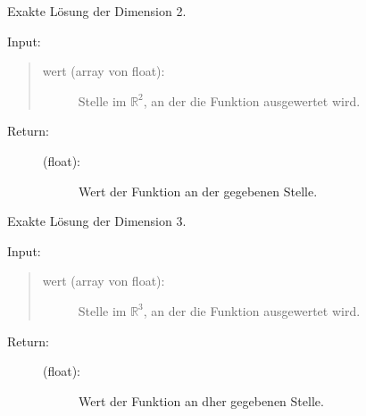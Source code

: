 \documentclass[letterpaper,10pt,ngerman, oneside, openright]{sphinxmanual}
\begin{document}

\begin{fulllineitems}
\label{\detokenize{index:aufg_5_2.ulsg2}}
Exakte Lösung der Dimension 2.
\begin{description}
\item [{Input:}]
\end{description}
\begin{quote}
\begin{description}
\item[{wert (array von float):}] \leavevmode
Stelle im $\mathbb{R}^2$, an der die Funktion ausgewertet wird.

\end{description}
\end{quote}
\begin{description}
\item[{Return:}] \leavevmode\begin{description}
\item[{(float):}] \leavevmode
Wert der Funktion an der gegebenen Stelle.

\end{description}

\end{description}

\end{fulllineitems}


\begin{fulllineitems}
\label{\detokenize{index:aufg_5_2.ulsg3}}
Exakte Lösung der Dimension 3.
\begin{description}
\item [{Input:}]
\end{description}
\begin{quote}
\begin{description}
\item[{wert (array von float):}] \leavevmode
Stelle im $\mathbb{R}^3$, an der die Funktion ausgewertet wird.

\end{description}
\end{quote}
\begin{description}
\item[{Return:}] \leavevmode\begin{description}
\item[{(float):}] \leavevmode
Wert der Funktion an dher gegebenen Stelle.

\end{description}

\end{description}

\end{fulllineitems}





\end{document}
